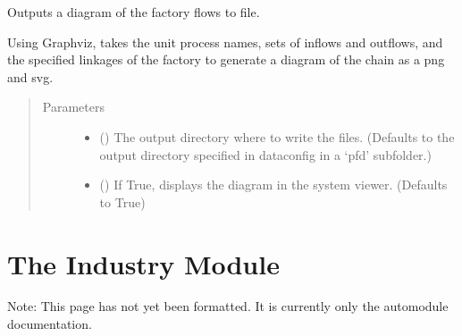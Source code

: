 \documentclass[a4paper,10pt,english]{sphinxmanual}
\begin{document}
\begin{fulllineitems}
\begin{fulllineitems}
\label{\detokenize{factory:factory.Factory.diagram}}
Outputs a diagram of the factory flows to file.

Using Graphviz, takes the unit process names, sets of inflows and
outflows, and the specified linkages of the factory to generate a
diagram of the chain as a png and svg.
\begin{quote}\begin{description}
\item[{Parameters}] \leavevmode\begin{itemize}
\item {} 
 () \textendash{} The output directory where to write the files.
(Defaults to the output directory specified in dataconfig in
a ‘pfd’ subfolder.)

\item {} 
 () \textendash{} If True, displays the diagram in the system
viewer.
(Defaults to True)

\end{itemize}

\end{description}\end{quote}

\end{fulllineitems}


\end{fulllineitems}



\section{The Industry Module}
\label{\detokenize{industry:the-industry-module}}\label{\detokenize{industry::doc}}
Note: This page has not yet been formatted. It is currently only the automodule documentation.

\label{\detokenize{industry:module-industry}}
\end{document}
